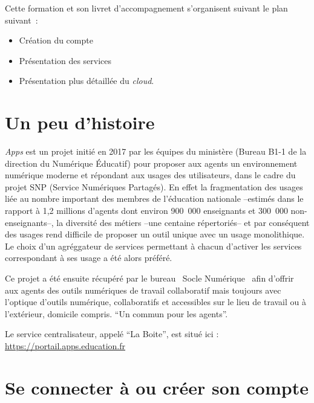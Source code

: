 \documentclass[a4paper, 11pt]{book}
\begin{document}
\vspace{2cm}

Cette formation et son livret d'accompagnement s'organisent suivant le plan suivant~:
\begin{itemize}
    \item Création du compte
    \item Présentation des services
    \item Présentation plus détaillée du \emph{cloud\/}.
\end{itemize}

\chapter*{Un peu d'histoire}

\emph{Apps} est un projet initié en 2017 par les équipes du ministère (Bureau B1-1 de la direction du Numérique Éducatif) pour proposer aux agents un environnement numérique  moderne et répondant aux usages des utilisateurs, dans le cadre du projet SNP (Service Numériques Partagés). 
En effet la fragmentation des usages liée au nombre important des membres de l'éducation nationale --estimés dans le rapport à 1,2 millions d'agents dont environ 900~000 enseignants et 300~000 non-enseignants--, la diversité des métiers --une centaine répertoriés-- et par conséquent des usages rend difficile de proposer un outil unique avec un usage monolithique. 
Le choix d'un agréggateur de services permettant à chacun d'activer les services correspondant à ses usage a été alors préféré.

Ce projet a été ensuite récupéré par le bureau \og~Socle Numérique~\fg{} afin d'offrir aux agents des outils numériques de travail collaboratif mais toujours avec l'optique d'outils numérique, collaboratifs et accessibles sur le lieu de travail ou à l'extérieur, domicile compris. ``Un commun pour les agents''.

Le service centralisateur, appelé ``La Boite'',  est situé ici : \url{https://portail.apps.education.fr}

\chapter*{Se connecter à ou créer son compte}
\end{document}
